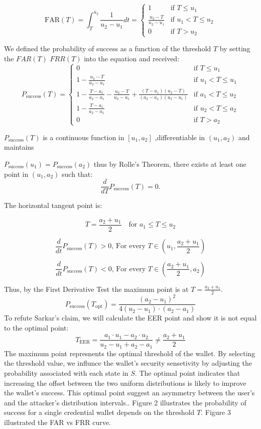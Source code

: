 \documentclass{article}
\begin{document}
\[
\text{FAR}(T) = \int_{T}^{u_2} \frac{1}{u_2-u_1} dt =
\left\{
\begin{array}{ll}
1 & \text{if } T \le u_1 \\
\frac{u_2-T}{u_2 - u_1} & \text{if } u_1 < T \le u_2 \\
0 & \text{if } T > u_2
\end{array}
\right.
\]

We defined the probability of success as a function of the threshold $T$ by setting the $FAR(T)$ $FRR(T)$ into the equation and received:
\[
P_{\text{success}}(T) = 
\left\{
\begin{array}{ll}
    0 & \text{if } T \le u_1 \\
    1 - \frac{u_2-T}{u_2-u_1} & \text{if } u_1 < T \le u_1 \\
    1 - \frac{T-a_1}{a_2-a_1} - \frac{u_2-T}{u_2-u_1} + \frac{(T-a_1)(u_2-T)}{(a_2-a_1)(u_2-u_1)} & \text{if } a_1 < T \le u_2 \\
    1 - \frac{T-a_1}{a_2-a_1} & \text{if } u_2 < T \le a_2 \\
    0 & \text{if } T > a_2
    \end{array}
\right.
\]

$P_{\text{success}}(T)$ is a continuous function in $[u_1,a_2]$ ,differentiable in $(u_1,a_2)$ and maintains 

$P_{\text{success}}(u_1) = P_{\text{success}}(a_2)$ thus by Rolle's Theorem, there exists at least one point in $(u_1,a_2)$ such that:
\[\frac{d}{dT} P_{\text{success}}(T) = 0.\] 

The horizontal tangent point is:

\[
T = \frac{a_2+u_1}{2} \quad \text{for } a_1 \leq T \leq u_2
\]

\[\frac{d}{dt} P_{\text{success}}(T) > 0 \text{, For every } T \in (u_1, \frac{a_2+u_1}{2}) \]

\[\frac{d}{dt} P_{\text{success}}(T) < 0 \text{, For every } T \in (\frac{a_2+u_1}{2}, a_2) \]

Thus, by the First Derivative Test the maximum point is at $T = \frac{a_2+u_1}{2}$.
\[
P_{\text{success}}(T_{\text{opt}}) = \frac{(a_2 - u_1)^2}{4(u_2 - u_1) \cdot(a_2 - a_1)} 
\]
To refute Sarkar's claim, we will calculate the EER point and show it is not equal to the optimal point:
\[
T_{\text{EER}} = \frac{a_1 \cdot u_1 - a_2 \cdot u_2}{u_2 - u_1 + a_2 - a_1} \neq \frac{a_2 + u_1}{2}
\] 
The maximum point represnents the optimal threshold of the wallet. By selecting the threshold value, we influnce the wallet's security sensetivity by adjusting the probability associated with each state in $S$. The optimal point indicates that increasing the offset between the two uniform distributions is likely to improve the wallet's success. This optimal point suggest an asymmetry between the user’s and the attacker’s distribution intervals.. Figure 2 illustrates the probability of success for a single credential wallet depends on the threshold $T$. Figure 3 illustrated the FAR vs FRR curve.
\end{document}
